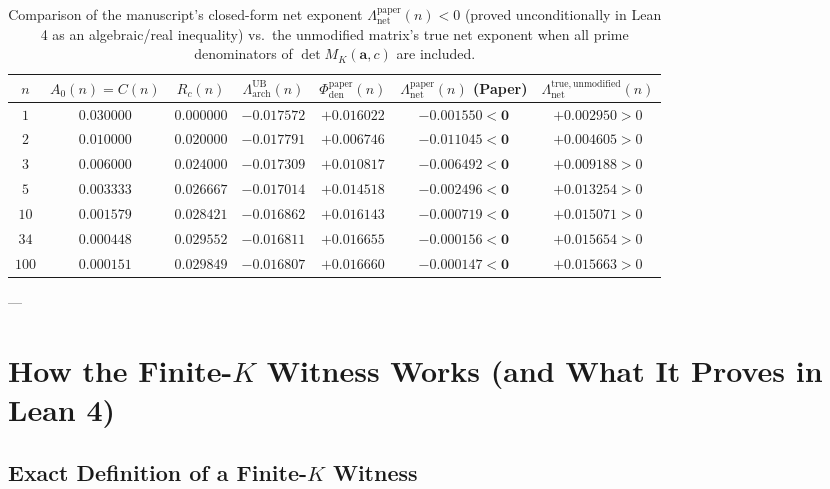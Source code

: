 \documentclass[11pt,a4paper]{article}
\begin{document}
\begin{table}[h!]
\centering
\small
\begin{tabular}{ccccccc}
\toprule
$n$ & $A_0(n) = C(n)$ & $R_c(n)$ & $\Lambda_{\mathrm{arch}}^{\mathrm{UB}}(n)$ & $\Phi_{\mathrm{den}}^{\mathrm{paper}}(n)$ & $\Lambda_{\mathrm{net}}^{\mathrm{paper}}(n)$ (Paper) & $\Lambda_{\mathrm{net}}^{\mathrm{true,unmodified}}(n)$ \\
\midrule
$1$ & $0.030000$ & $0.000000$ & $-0.017572$ & $+0.016022$ & $\mathbf{-0.001550 < 0}$ & $+0.002950 > 0$ \\
$2$ & $0.010000$ & $0.020000$ & $-0.017791$ & $+0.006746$ & $\mathbf{-0.011045 < 0}$ & $+0.004605 > 0$ \\
$3$ & $0.006000$ & $0.024000$ & $-0.017309$ & $+0.010817$ & $\mathbf{-0.006492 < 0}$ & $+0.009188 > 0$ \\
$5$ & $0.003333$ & $0.026667$ & $-0.017014$ & $+0.014518$ & $\mathbf{-0.002496 < 0}$ & $+0.013254 > 0$ \\
$10$ & $0.001579$ & $0.028421$ & $-0.016862$ & $+0.016143$ & $\mathbf{-0.000719 < 0}$ & $+0.015071 > 0$ \\
$34$ & $0.000448$ & $0.029552$ & $-0.016811$ & $+0.016655$ & $\mathbf{-0.000156 < 0}$ & $+0.015654 > 0$ \\
$100$ & $0.000151$ & $0.029849$ & $-0.016807$ & $+0.016660$ & $\mathbf{-0.000147 < 0}$ & $+0.015663 > 0$ \\
\bottomrule
\end{tabular}
\caption{Comparison of the manuscript's closed-form net exponent $\Lambda_{\mathrm{net}}^{\mathrm{paper}}(n) < 0$ (proved unconditionally in Lean 4 as an algebraic/real inequality) vs.\ the unmodified matrix's true net exponent when all prime denominators of $\det M_K(\mathbf{a}, c)$ are included.}
\label{tab:exponents}
\end{table}

---

\section{How the Finite-$K$ Witness Works (and What It Proves in Lean 4)}

\subsection{Exact Definition of a Finite-$K$ Witness}
\end{document}
